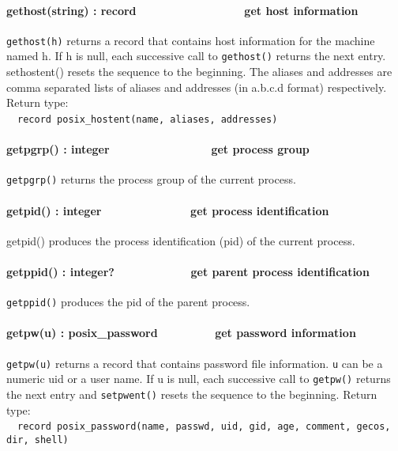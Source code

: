 \paragraph[gethost(string) : record\ \ \ \ \ \ \ \ \ \ 
\ \ \ \ \ \ \ get host information]{gethost(string) :
record\ \ \ \ \ \ \ \ \ \  \ \ \ \ \ \ \ get host information}
\texttt{gethost(h)} returns a record that contains host information for the
machine named h. If h is null, each successive call to \texttt{gethost()}
returns the next entry. sethostent() resets the sequence to the
beginning. The aliases and addresses are comma separated lists of
aliases and addresses (in a.b.c.d format) respectively. Return
type:\\
\ \ \texttt{record posix\_hostent(name, aliases, addresses)}

\paragraph[getpgrp() : integer\ \ \ \ \ \ \ \ \ \ \ \ \ \  \ \ get
process group]{getpgrp() : integer\ \ \ \ \ \ \ \ \ \ \ \ \ \  \ \ get
process group}
\texttt{getpgrp()} returns the process group of the current process. 

\paragraph[getpid() : integer\ \ \ \ \ \ \ \ \ \ \ \  \ \ get process
identification]{getpid() : integer\ \ \ \ \ \ \ \ \ \ \ \  \ \ get
process identification}
getpid() produces the process identification (pid) of the current
process.

\paragraph[getppid() : integer?\ \ \ \ \ \ \ \ \ \  \ \ get parent
process identification]{getppid() : integer?\ \ \ \ \ \ \ \ \ \ 
\ \ get parent process identification}
\texttt{getppid()} produces the pid of the parent process.

\paragraph[getpw(u) : posix\_password\ \ \ \ \ \ \ \  \ get password
information]{getpw(u) : posix\_password\ \ \ \ \ \ \ \  \ get password
information}
\texttt{getpw(u)} returns a record that contains password file
information. \texttt{u} can
be a numeric uid or a user name. If u is null, each successive call to
\texttt{getpw()} returns the next entry and \texttt{setpwent()} resets
the sequence to the beginning. Return type:\\
\ \ \texttt{record posix\_password(name, passwd, uid, gid, age, comment, gecos,
dir, shell)}

